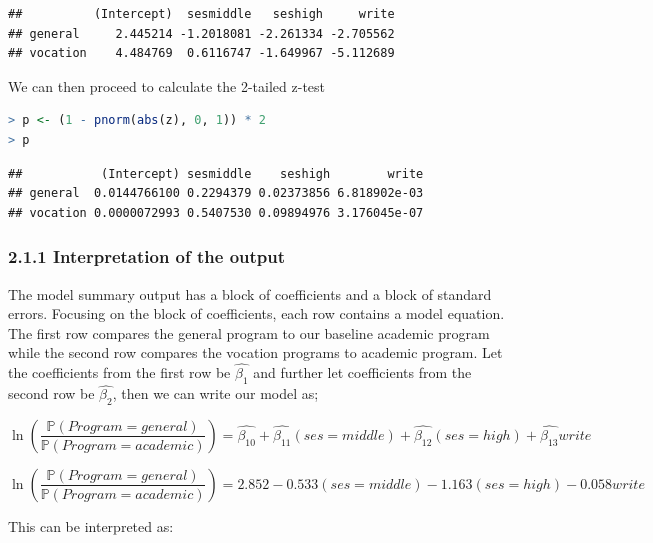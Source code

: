 \documentclass[
]{article}
\begin{document}
\begin{lstlisting}
##          (Intercept)  sesmiddle   seshigh     write
## general     2.445214 -1.2018081 -2.261334 -2.705562
## vocation    4.484769  0.6116747 -1.649967 -5.112689
\end{lstlisting}

We can then proceed to calculate the 2-tailed z-test

\begin{lstlisting}[language=R]
> p <- (1 - pnorm(abs(z), 0, 1)) * 2
> p
\end{lstlisting}

\begin{lstlisting}
##           (Intercept) sesmiddle    seshigh        write
## general  0.0144766100 0.2294379 0.02373856 6.818902e-03
## vocation 0.0000072993 0.5407530 0.09894976 3.176045e-07
\end{lstlisting}

\hypertarget{interpretation-of-the-output}{%
\subsubsection{2.1.1 Interpretation of the
output}\label{interpretation-of-the-output}}

The model summary output has a block of coefficients and a block of
standard errors. Focusing on the block of coefficients, each row
contains a model equation. The first row compares the general program to
our baseline academic program while the second row compares the vocation
programs to academic program. Let the coefficients from the first row be
\(\hat{\beta_1}\) and further let coefficients from the second row be
\(\hat{\beta_2}\), then we can write our model as;

\[\ln(\frac{\mathbb{P}(Program=general)}{\mathbb{P}(Program=academic)})=\hat{\beta_{10}}+\hat{\beta_{11}}(ses=middle)+\hat{\beta_{12}}(ses=high)+\hat{\beta_{13}}write\]

\[\ln(\frac{\mathbb{P}(Program=general)}{\mathbb{P}(Program=academic)})=2.852-0.533(ses=middle)-1.163(ses=high)-0.058write\]

This can be interpreted as:
\end{document}
